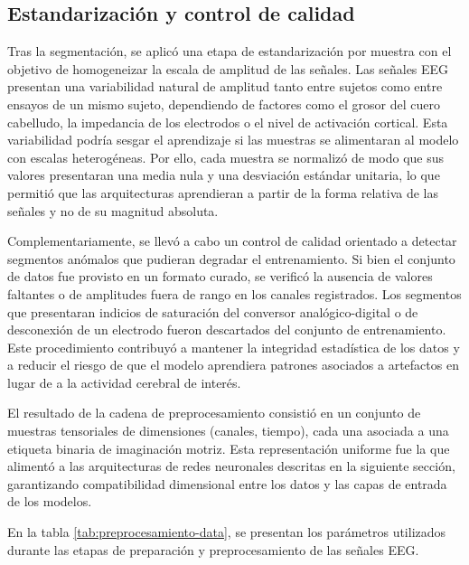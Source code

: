 \subsection{Estandarización y control de calidad}

Tras la segmentación, se aplicó una etapa de estandarización por muestra con el objetivo de homogeneizar la escala de amplitud de las señales. Las señales EEG presentan una variabilidad natural de amplitud tanto entre sujetos como entre ensayos de un mismo sujeto, dependiendo de factores como el grosor del cuero cabelludo, la impedancia de los electrodos o el nivel de activación cortical. Esta variabilidad podría sesgar el aprendizaje si las muestras se alimentaran al modelo con escalas heterogéneas. Por ello, cada muestra se normalizó de modo que sus valores presentaran una media nula y una desviación estándar unitaria, lo que permitió que las arquitecturas aprendieran a partir de la forma relativa de las señales y no de su magnitud absoluta.

Complementariamente, se llevó a cabo un control de calidad orientado a detectar segmentos anómalos que pudieran degradar el entrenamiento. Si bien el conjunto de datos fue provisto en un formato curado, se verificó la ausencia de valores faltantes o de amplitudes fuera de rango en los canales registrados. Los segmentos que presentaran indicios de saturación del conversor analógico-digital o de desconexión de un electrodo fueron descartados del conjunto de entrenamiento. Este procedimiento contribuyó a mantener la integridad estadística de los datos y a reducir el riesgo de que el modelo aprendiera patrones asociados a artefactos en lugar de a la actividad cerebral de interés.

El resultado de la cadena de preprocesamiento consistió en un conjunto de muestras tensoriales de dimensiones (canales, tiempo), cada una asociada a una etiqueta binaria de imaginación motriz. Esta representación uniforme fue la que alimentó a las arquitecturas de redes neuronales descritas en la siguiente sección, garantizando compatibilidad dimensional entre los datos y las capas de entrada de los modelos.

En la tabla \ref{tab:preprocesamiento-data}, se presentan los parámetros utilizados durante las etapas de preparación y preprocesamiento de las señales EEG.

